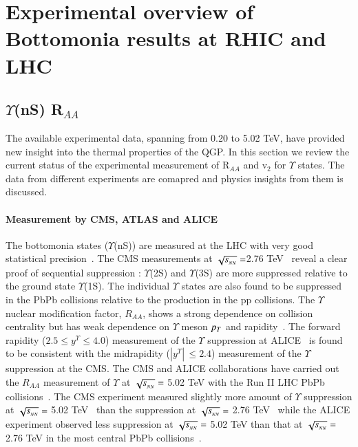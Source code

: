 \section{Experimental overview of Bottomonia results at RHIC and LHC}



\subsection{$\Upsilon$(nS) R$_{AA}$}
The available experimental data, spanning from 0.20 to 5.02 TeV, have provided new insight into the thermal properties
of the QGP. In this section we review the current status of the experimental measurement of R$_{AA}$ and v$_{2}$ for
$\Upsilon$ states. The data from different experiments are comapred and physics insights from them is discussed.   
\paragraph{Measurement by CMS, ATLAS and ALICE}

The bottomonia states ($\Upsilon$(nS)) are measured at the LHC with very good statistical
precision~\cite{Chatrchyan:2012lxa,Abelev:2014nua,Chatrchyan:2011pe,Khachatryan:2016xxp}.
The CMS measurements at $\sqrt{s_{_{NN}}} =$2.76 TeV~\cite{Chatrchyan:2012lxa,Chatrchyan:2011pe} reveal
a clear proof of sequential suppression :  $\Upsilon$(2S) and $\Upsilon$(3S) are 
more suppressed relative to the ground state $\Upsilon$(1S).   The individual $\Upsilon$ states are also found to be suppressed in
the PbPb collisions relative to the production in the pp collisions. The $\Upsilon$ nuclear
modification factor, $R_{AA}$, shows a strong dependence on collision centrality but has
weak dependence on $\Upsilon$ meson $p_{T}$ and rapidity~\cite{Khachatryan:2016xxp}.
The forward rapidity ($2.5 \leq y^{\Upsilon} \leq 4.0$) measurement of the $\Upsilon$ suppression at 
ALICE~\cite{Abelev:2014nua} is found to be consistent with the midrapidity ($|y^{\Upsilon}|\,\leq 2.4$)
measurement of the $\Upsilon$ suppression at the CMS. 
The CMS and ALICE collaborations have carried out the $R_{AA}$ measurement of $\Upsilon$
at $\sqrt{s_{_{NN}}} =$ 5.02 TeV with the Run II LHC PbPb
collisions~\cite{Sirunyan:2018nsz,Sirunyan:2017lzi,ALICE:2018wzm}.
The CMS experiment measured slightly more amount of $\Upsilon$ suppression at
$\sqrt{s_{_{NN}}} =$ 5.02 TeV~\cite{Sirunyan:2018nsz,Sirunyan:2017lzi} than the suppression at
$\sqrt{s_{_{NN}}} =$ 2.76 TeV~\cite{Khachatryan:2016xxp} while the ALICE experiment observed less
suppression at $\sqrt{s_{_{NN}}} =$ 5.02 TeV than that at $\sqrt{s_{_{NN}}} =$ 2.76 TeV 
in the most central PbPb collisions~\cite{Abelev:2014nua,ALICE:2018wzm}. 


